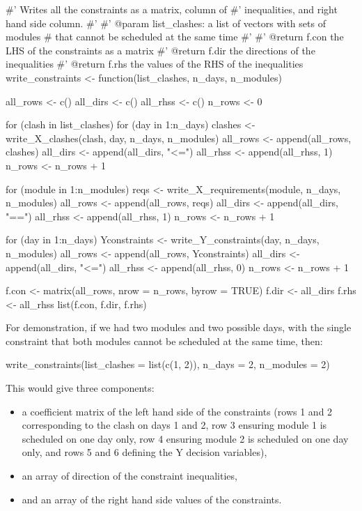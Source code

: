 \begin{Rin}
#' Writes all the constraints as a matrix, column of
#' inequalities, and right hand side column.
#'
#' @param list_clashes: a list of vectors with sets of modules
#         that cannot be scheduled at the same time
#'
#' @return f.con the LHS of the constraints as a matrix
#' @return f.dir the directions of the inequalities
#' @return f.rhs the values of the RHS of the inequalities
write_constraints <- function(list_clashes, n_days, n_modules){
  all_rows <- c()
  all_dirs <- c()
  all_rhss <- c()
  n_rows <- 0
  
  for (clash in list_clashes){
    for (day in 1:n_days){
      clashes <- write_X_clashes(clash, day, n_days, n_modules)
      all_rows <- append(all_rows, clashes)
      all_dirs <- append(all_dirs, "<=")
      all_rhss <- append(all_rhss, 1)
      n_rows <- n_rows + 1
    }
  }
  
  for (module in 1:n_modules){
    reqs <- write_X_requirements(module, n_days, n_modules)
    all_rows <- append(all_rows, reqs)
    all_dirs <- append(all_dirs, "==")
    all_rhss <- append(all_rhss, 1)
    n_rows <- n_rows + 1
  }
  
  for (day in 1:n_days){
    Yconstraints <- write_Y_constraints(day, n_days, n_modules)
    all_rows <- append(all_rows, Yconstraints)
    all_dirs <- append(all_dirs, "<=")
    all_rhss <- append(all_rhss, 0)
    n_rows <- n_rows + 1
  }
  
  f.con <- matrix(all_rows, nrow = n_rows, byrow = TRUE)
  f.dir <- all_dirs
  f.rhs <- all_rhss
  list(f.con, f.dir, f.rhs)
}
\end{Rin}

For demonstration, if we had two modules and two possible days, with the single
constraint that both modules cannot be scheduled at the same time, then:

\begin{Rin}
write_constraints(list_clashes = list(c(1, 2)),
                  n_days = 2,
                  n_modules = 2)
\end{Rin}

This would give three components:
\begin{itemize}
  \item a coefficient matrix of the left hand side of the constraints (rows 1
  and 2 corresponding to the clash on days 1 and 2, row 3 ensuring module 1 is
  scheduled on one day only, row 4 ensuring module 2 is scheduled on one day
  only, and rows 5 and 6 defining the Y decision variables),
  \item an array of direction of the constraint inequalities,
  \item and an array of the right hand side values of the constraints.
\end{itemize}

